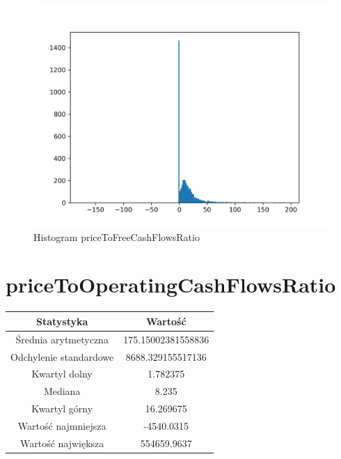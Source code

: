 \documentclass{article}
\begin{document}
\begin{figure}[h!]
    \includegraphics[width=\linewidth]{variables/priceToFreeCashFlowsRatio.png}
    \caption{Histogram priceToFreeCashFlowsRatio }
\end{figure}\section{ priceToOperatingCashFlowsRatio }

\begin{center}
    \begin{tabular}{|c | c|} 
    \hline
    Statystyka & Wartość \\
    \hline\hline
    Średnia arytmetyczna & 175.15002381558836 \\ 
    \hline
    Odchylenie standardowe & 8688.329155517136 \\
    \hline
    Kwartyl dolny & 1.782375 \\
    \hline
    Mediana & 8.235 \\
    \hline
    Kwartyl górny & 16.269675 \\
    \hline
    Wartość najmniejsza & -4540.0315 \\
    \hline
    Wartość największa & 554659.9637 \\
    \hline
   \end{tabular}
\end{center}
\end{document}
